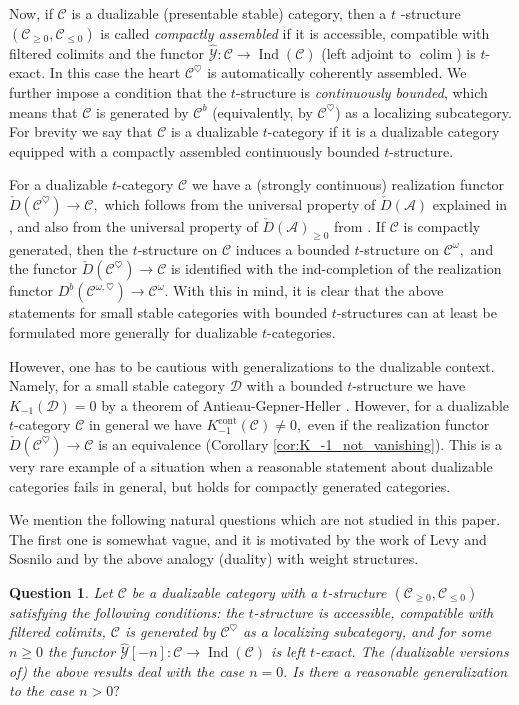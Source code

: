 \documentclass[11pt,leqno]{amsart}
\newtheorem{ques}[theo]{Question}
\numberwithin{equation}{section}
\DeclareMathOperator*{\colim}{colim}
\newcommand{\cont}{\operatorname{cont}}
\newcommand{\cD}{{\mathcal D}}
\newcommand{\cA}{{\mathcal A}}
\newcommand{\cC}{{\mathcal C}}
\newcommand{\cY}{{\mathcal Y}}
\newcommand{\Ind}{\operatorname{Ind}}
\begin{document}
Now, if $\cC$ is a dualizable (presentable stable) category, then a $t$ -structure $(\cC_{\geq 0},\cC_{\leq 0})$ is called {\it compactly assembled} if it is accessible, compatible with filtered colimits and the functor $\hat{\cY}:\cC\to \Ind(\cC)$ (left adjoint to $\colim$) is $t$-exact. In this case the heart $\cC^{\heartsuit}$ is automatically coherently assembled. We further impose a condition that the $t$-structure is {\it continuously bounded}, which means that $\cC$ is generated by $\cC^b$ (equivalently, by $\cC^{\heartsuit}$) as a localizing subcategory. For brevity we say that $\cC$ is a dualizable $t$-category if it is a dualizable category equipped with a compactly assembled continuously bounded $t$-structure.

For a dualizable $t$-category $\cC$ we have a (strongly continuous) realization functor $\check{D}(\cC^{\heartsuit})\to\cC,$ which follows from the universal property of $\check{D}(\cA)$ explained in \cite{Lur17b}, and also from the universal property of $\check{D}(\cA)_{\geq 0}$ from \cite[Proposition C.5.5.20, Theorem C.5.8.8]{Lur18}. If $\cC$ is compactly generated, then the $t$-structure on $\cC$ induces a bounded $t$-structure on $\cC^{\omega},$ and the functor $\check{D}(\cC^{\heartsuit})\to\cC$ is identified with the ind-completion of the realization functor $D^b(\cC^{\omega,\heartsuit})\to\cC^{\omega}.$ With this in mind, it is clear that the above statements for small stable categories with bounded $t$-structures can at least be formulated more generally for dualizable $t$-categories.

However, one has to be cautious with generalizations to the dualizable context. Namely, for a small stable category $\cD$ with a bounded $t$-structure we have $K_{-1}(\cD)=0$ by a theorem of Antieau-Gepner-Heller \cite[Theorem 2.35]{AGH19}. However, for a dualizable $t$-category $\cC$ in general we have $K_{-1}^{\cont}(\cC)\ne 0,$ even if the realization functor $\check{D}(\cC^{\heartsuit})\to\cC$ is an equivalence (Corollary \ref{cor:K_-1_not_vanishing}). This is a very rare example of a situation when a reasonable statement about dualizable categories fails in general, but holds for compactly generated categories.

We mention the following natural questions which are not studied in this paper. The first one is somewhat vague, and it is motivated by the work of Levy and Sosnilo \cite{LS25} and by the above analogy (duality) with weight structures.

\begin{ques}\label{ques:non_coherence_rank_positive} Let $\cC$ be a dualizable category with a $t$-structure $(\cC_{\geq 0},\cC_{\leq 0})$ satisfying the following conditions: the $t$-structure is accessible, compatible with filtered colimits, $\cC$ is generated by $\cC^{\heartsuit}$ as a localizing subcategory, and for some $n\geq 0$ the functor $\hat{\cY}[-n]:\cC\to\Ind(\cC)$ is left $t$-exact. The (dualizable versions of) the above results deal with the case $n=0.$ Is there a reasonable generalization to the case $n>0?$
\end{ques}
\end{document}
